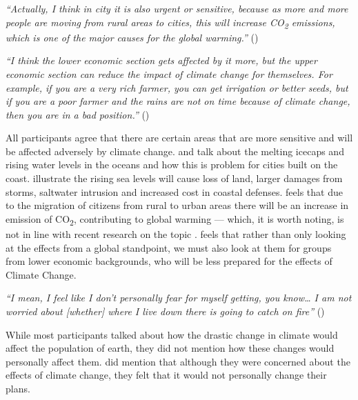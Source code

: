     \begin{quoting}
        \textit{``Actually, I think in city it is also urgent or sensitive, because as more and more people are moving from rural areas to cities, this will increase CO\textsubscript{2} emissions, which is one of the major causes for the global warming.''} ()
    \end{quoting}
    
    \begin{quoting}
        \textit{``I think the lower economic section gets affected by it more, but the upper economic section can reduce the impact of climate change for themselves. For example, if you are a very rich farmer, you can get irrigation or better seeds, but if you are a poor farmer and the rains are not on time because of climate change, then you are in a bad position.''} ()
    \end{quoting}

    All participants agree that there are certain areas that are more sensitive and will be affected adversely by climate change.  and  talk about the melting icecaps and rising water levels in the oceans and how this is problem for cities built on the coast. \citet{hitz2004estimating} illustrate the rising sea levels will cause loss of land, larger damages from storms, saltwater intrusion and increased cost in coastal defenses.  feels that due to the migration of citizens from rural to urban areas there will be an increase in emission of CO\textsubscript{2}, contributing to global warming --- which, it is worth noting, is not in line with recent research on the topic \cite{castells2020density}.  feels that rather than only looking at the effects from a global standpoint, we must also look at them for groups from lower economic backgrounds, who will be less prepared for the effects of Climate Change.
    
    \begin{quoting}
        \textit{``I mean, I feel like I don't personally fear for myself getting, you know… I am not worried about [whether] where I live down there is going to catch on fire''} ()
    \end{quoting}

    While most participants talked about how the drastic change in climate would affect the population of earth, they did not mention how these changes would personally affect them.  did mention that although they were concerned about the effects of climate change, they felt that it would not personally change their plans.
